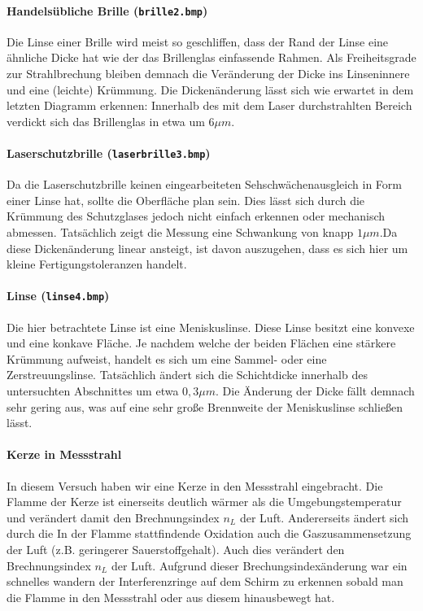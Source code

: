 \paragraph{Handelsübliche Brille (\texttt{brille2.bmp})}

Die Linse einer Brille wird meist so geschliffen, dass der Rand der Linse eine ähnliche Dicke hat wie der das Brillenglas einfassende Rahmen. Als Freiheitsgrade zur Strahlbrechung bleiben demnach die Veränderung der Dicke ins Linseninnere und eine (leichte) Krümmung.
Die Dickenänderung lässt sich wie erwartet in dem letzten Diagramm erkennen: Innerhalb des mit dem Laser durchstrahlten Bereich verdickt sich das Brillenglas in etwa um $6\mu m$.
 
\paragraph{Laserschutzbrille (\texttt{laserbrille3.bmp})}
Da die Laserschutzbrille keinen eingearbeiteten Sehschwächenausgleich in Form einer Linse hat, sollte die Oberfläche plan sein. Dies lässt sich durch die Krümmung des Schutzglases jedoch nicht einfach erkennen oder mechanisch abmessen. 
Tatsächlich zeigt die Messung eine Schwankung von knapp $1\mu m$.Da diese Dickenänderung linear ansteigt, ist davon auszugehen, dass es sich hier um kleine Fertigungstoleranzen handelt.

\paragraph{Linse (\texttt{linse4.bmp})}
Die hier betrachtete Linse ist eine Meniskuslinse. Diese Linse besitzt eine konvexe und eine konkave Fläche. Je nachdem welche der beiden Flächen eine stärkere Krümmung aufweist, handelt es sich um eine Sammel- oder eine Zerstreuungslinse. 
Tatsächlich ändert sich die Schichtdicke innerhalb des untersuchten Abschnittes um etwa $0,3\mu m$. Die Änderung der Dicke fällt demnach sehr gering aus, was auf eine sehr große Brennweite der Meniskuslinse schließen lässt. 

\paragraph{Kerze in Messstrahl}
In diesem Versuch haben wir eine Kerze in den Messstrahl eingebracht. Die Flamme der Kerze ist einerseits deutlich wärmer als die Umgebungstemperatur und verändert damit den Brechnungsindex $n_L$ der Luft. Andererseits ändert sich durch die In der Flamme stattfindende Oxidation auch die Gaszusammensetzung der Luft (z.B. geringerer Sauerstoffgehalt). Auch dies verändert den Brechnungsindex $n_L$ der Luft. 
Aufgrund dieser Brechungsindexänderung war ein schnelles wandern der Interferenzringe auf dem Schirm zu erkennen sobald man die Flamme in den Messstrahl oder aus diesem hinausbewegt hat.

